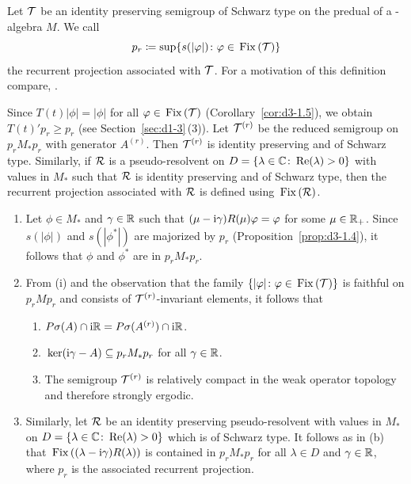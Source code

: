 Let $\mathcal{T}$ be an identity preserving semigroup of Schwarz type on the predual of a \WA-algebra $M$.
We call
\[
p_{r} \coloneqq \sup\{s(|\phi|) \colon \phi \in \Fix{\TT}\}
\]
the recurrent projection associated with $\mathcal{T}$.
For a motivation of this definition compare, \eg \textcite[Section 6.3]{davies:1976}.

Since $T(t)|\phi| = |\phi|$ for all $\phi \in \Fix{\TT}$ (Corollary~\ref{cor:d3-1.5}), we obtain $T(t)'p_{r} \geq p_{r}$ (see Section~\ref{sec:d1-3}\,(3)).
Let $\mathcal{T}^{(r)}$ be the reduced semigroup on $p_{r}M_{*}p_{r}$ with generator $A^{(r)}$.
Then $\mathcal{T}^{(r)}$ is identity preserving and of Schwarz type.
Similarly, if\/ $\mathcal{R}$ is a pseudo-resolvent 
on $D = \{\lambda \in \mathbb{C} \colon \mathop{}\!\mathrm{Re}(\lambda) > 0\}$ with values in $M_{*}$ such that $\mathcal{R}$ is identity preserving and of Schwarz type, then the recurrent projection associated with $\mathcal{R}$ is defined using $\mathop{}\mathrm{Fix}\left(\mathcal{R}\right)$.
\begin{remark}\label{rem:d4-3.2}
\begin{enumerate}[\upshape (i), wide, labelindent=.25em]

\item\label{item:d4-3.2-i}
Let $\phi \in M_{*}$ and $\gamma \in \mathbb{R}$ such that $(\mu - \im\gamma)R(\mu)\phi = \phi$ for some $\mu \in \mathbb{R}_{+}$.
Since $s(|\phi|)$ and $s(|\phi^{*}|)$ are majorized by $p_{r}$ (Proposition~\ref{prop:d3-1.4}), it follows that $\phi$ and $\phi^{*}$ are in $p_{r}M_{*}p_{r}$.

\item\label{item:d4-3.2-ii}
From (i) and the observation that the family $\{|\phi| \colon \phi \in \Fix{\TT}\}$ is
faithful on $p_{r}Mp_{r}$ and consists of\/ $\mathcal{T}^{(r)}$-invariant elements, it follows that
\begin{enumerate}[--]
\item
$P\sigma(A) \cap \mathrm{i}\mathbb{R} = P\sigma(A^{(r)}) \cap \mathrm{i}\mathbb{R}$.

\item
$\mathop{}\mathrm{ker}( \mathrm{i}\gamma - A ) \subseteq p_{r}M_{*}p_{r}$ for all $\gamma \in \mathbb{R}$.

\item
The semigroup $\mathcal{T}^{(r)}$ is relatively compact in the weak operator topology and therefore strongly ergodic.
\end{enumerate}

\item\label{item:d4-3.2-iii}
Similarly, let $\mathcal{R}$ be an identity preserving pseudo-resolvent with values in $M_{*}$ on $D = \{\lambda \in \mathbb{C} \colon \mathop{}\!\mathrm{Re}(\lambda) > 0\}$ which is of Schwarz type.
It follows as in (b) that 
$\mathop{}\mathrm{Fix}\left((\lambda - \mathrm{i}\gamma)R(\lambda)\right)$ 
is contained in $p_{r}M_{*}p_{r}$ for all $\lambda \in D$ and $\gamma \in \mathbb{R}$, where $p_{r}$ is the associated recurrent projection.
\end{enumerate}
\end{remark}
